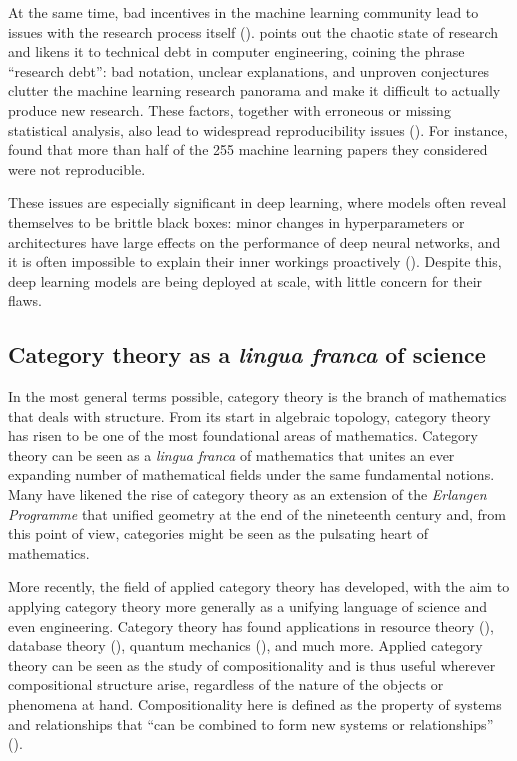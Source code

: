 \documentclass[11pt,a4paper,openright,twoside]{report}
\theoremstyle{plain}
\theoremstyle{definition}
\newcommand\dblquote[1]{\textquotedblleft #1\textquotedblright}
\begin{document}
At the same time, bad incentives in the machine learning community lead to issues with the research process itself (\cite{shiebler2021category}). \cite{olah2017research} points out the chaotic state of research and likens it to technical debt in computer engineering, coining the phrase \dblquote{research debt}: bad notation, unclear explanations, and unproven conjectures clutter the machine learning research panorama and make it difficult to actually produce new research. These factors, together with erroneous or missing statistical analysis, also lead to widespread reproducibility issues (\cite{gundersen2022sources}). For instance, \cite{raff2019step} found that more than half of the 255 machine learning papers they considered were not reproducible. 

These issues are especially significant in deep learning, where models often reveal themselves to be brittle black boxes: minor changes in hyperparameters or architectures have large effects on the performance of deep neural networks, and it is often impossible to explain their inner workings proactively (\cite{gavranovic2024fundamental}).
Despite this, deep learning models are being deployed at scale, with little concern for their flaws.  

\subsection*{Category theory as a \textit{lingua franca} of science}

In the most general terms possible, category theory is the branch of mathematics that deals with structure. From its start in algebraic topology, category theory has risen to be one of the most foundational areas of mathematics. Category theory can be seen as a \textit{lingua franca} of mathematics that unites an ever expanding number of mathematical fields under the same fundamental notions. Many have likened the rise of category theory as an extension of the \textit{Erlangen Programme} that unified geometry at the end of the nineteenth century and, from this point of view, categories might be seen as the pulsating heart of mathematics.

More recently, the field of applied category theory has developed, with the aim to applying category theory more generally as a unifying language of science and even engineering. Category theory has found applications in resource theory (\cite{coecke2016mathematical}), database theory (\cite{spivak2012functorial}), quantum mechanics (\cite{abramsky2009categorical}), and much more. Applied category theory can be seen as the study of compositionality and is thus useful wherever compositional structure arise, regardless of the nature of the objects or phenomena at hand. Compositionality here is defined as the property of systems and relationships that \dblquote{can be combined to form new systems or relationships} (\cite{fong2018seven}).
\end{document}

